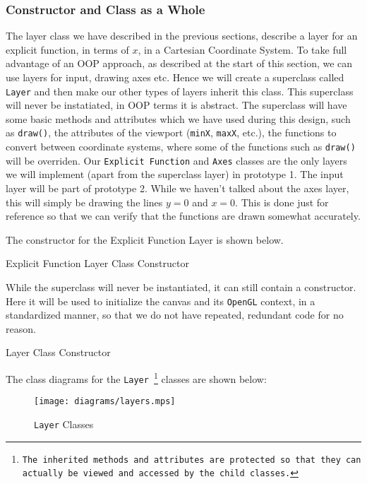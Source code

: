 \documentclass[../../../../../../main.tex]{subfiles}
\begin{document}
\subsubsection{Constructor and Class as a Whole}
The layer class we have described in the previous sections, describe a layer for an explicit function, in terms of $x$, in a Cartesian Coordinate System. To take full advantage of an OOP approach, as described at the start of this section, we can use layers for input, drawing axes etc. Hence we will create a superclass called \texttt{Layer} and then make our other types of layers inherit this class. This superclass will never be instatiated, in OOP terms it is abstract. The superclass will have some basic methods and attributes which we have used during this design, such as \texttt{draw()}, the attributes of the viewport (\texttt{minX}, \texttt{maxX}, etc.), the functions to convert between coordinate systems, where some of the functions such as \texttt{draw()} will be overriden. Our \texttt{Explicit Function} and \texttt{Axes} classes are the only layers we will implement (apart from the superclass layer) in prototype 1. The input layer will be part of prototype 2. While we haven't talked about the axes layer, this will simply be drawing the lines $y=0$ and $x=0$. This is done just for reference so that we can verify that the functions are drawn somewhat accurately.

The constructor for the Explicit Function Layer is shown below.

\begin{algorithm}[H]
\DontPrintSemicolon
\caption{Explicit Function Layer Class Constructor}
\end{algorithm}

While the superclass will never be instantiated, it can still contain a constructor. Here it will be used to initialize the canvas and its \texttt{OpenGL} context, in a standardized manner, so that we do not have repeated, redundant code for no reason.

\begin{algorithm}[H]
\DontPrintSemicolon
\caption{Layer Class Constructor}
\end{algorithm}

The class diagrams for the \texttt{Layer
\footnote{The inherited methods and attributes are protected so that they can actually be viewed and accessed by the child classes.}}
 classes are shown below:
\begin{figure}[H]
	\centering
	\texttt{[image: diagrams/layers.mps]}
	\caption{\texttt{Layer} Classes}
\end{figure}
\end{document}
